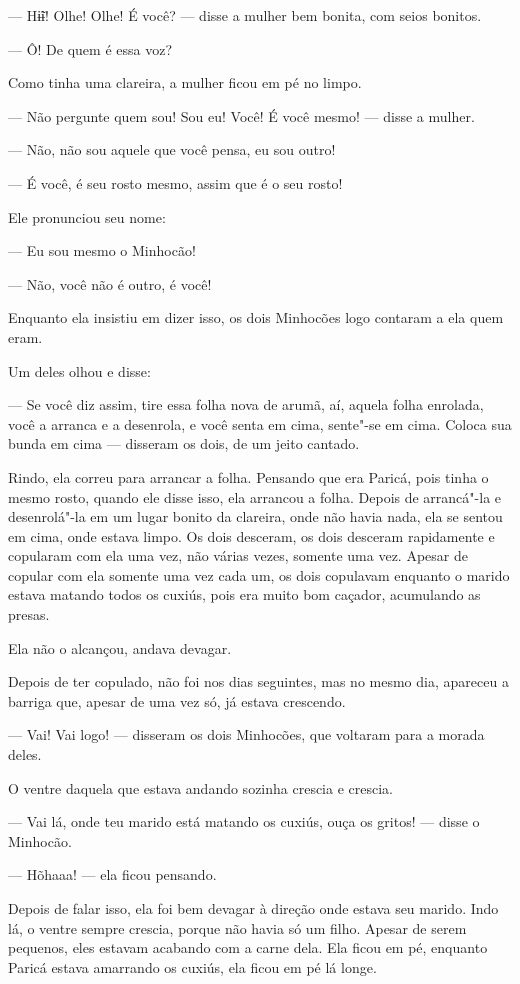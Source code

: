 --- Hɨ̃ɨ! Olhe! Olhe! É você? --- disse a mulher bem bonita, com seios
bonitos.

--- Ô! De quem é essa voz?

Como tinha uma clareira, a mulher ficou em pé no limpo. 

--- Não pergunte quem sou! Sou eu! Você! É você mesmo! --- disse a
mulher.

--- Não, não sou aquele que você pensa, eu sou outro! 

--- É você, é seu rosto mesmo, assim que é o seu rosto! 

Ele pronunciou seu nome: 

--- Eu sou mesmo o Minhocão!

--- Não, você não é outro, é você! 

Enquanto ela insistiu em dizer isso, os dois Minhocões logo contaram a ela quem eram. 

Um deles olhou e disse: 

--- Se você diz assim, tire essa folha nova de arumã, aí, aquela folha
enrolada, você a arranca e a desenrola, e você senta em cima, sente"-se
em cima. Coloca sua bunda em cima --- disseram os dois, de um jeito
cantado. 

Rindo, ela correu para arrancar a folha. Pensando que era Paricá, pois
tinha o mesmo rosto, quando ele disse isso, ela arrancou a folha. Depois
de arrancá"-la e desenrolá"-la em um lugar bonito da clareira, onde não
havia nada, ela se sentou em cima, onde estava limpo. Os dois desceram,
os dois desceram rapidamente e copularam com ela uma vez, não várias
vezes, somente uma vez. Apesar de copular com ela somente uma vez cada um, os dois copulavam enquanto o marido estava matando todos os cuxiús,
pois era muito bom caçador, acumulando as presas. 

Ela não o alcançou, andava devagar. 

Depois de ter copulado, não foi nos dias seguintes, mas no mesmo dia,
apareceu a barriga que, apesar de uma vez só, já estava crescendo. 

--- Vai! Vai logo! --- disseram os dois Minhocões, que voltaram para a
morada deles. 

O ventre daquela que estava andando sozinha crescia e crescia. 

--- Vai lá, onde teu marido está matando os cuxiús, ouça os gritos! ---
disse o Minhocão. 

--- Hõhaaa! --- ela ficou pensando.

Depois de falar isso, ela foi bem devagar à direção onde estava seu
marido. Indo lá, o ventre sempre crescia, porque não havia só um filho.
Apesar de serem pequenos, eles estavam acabando com a carne dela. Ela
ficou em pé, enquanto Paricá estava amarrando os cuxiús, ela ficou em pé
lá longe. 

